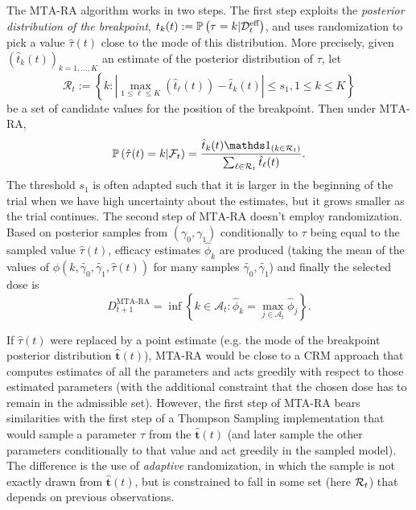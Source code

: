 The $\mathrm{MTA}$-$\mathrm{RA}$ algorithm works in two steps. The first step exploits the \emph{posterior distribution of the breakpoint}, $t_k(t) :=\mathbb{P}\left(\tau=k | \mathcal{D}_{t}^{\text{eff}}\right)$, and uses randomization to pick a value $\hat{\tau}(t)$ close to the mode of this distribution. More precisely, given $(\hat{t}_k(t))_{k=1,\dots,K}$ an estimate of the posterior distribution of $\tau$, let
\[
\mathcal{R}_t := \left\{
    k : \left| \max_{1 \le \ell \le K}(\hat{t}_\ell(t)) - \hat{t}_k(t) \right| \le s_1,
    1 \le k \le K
\right\}
\]
be a set of candidate values for the position of the breakpoint. Then under $\mathrm{MTA}$-$\mathrm{RA}$, 
\[\bP\left(\hat{\tau}(t) = k |\cF_t\right) = \frac{\hat{t}_k(t)\ind_{\left(k \in \cR_t\right)}}{\sum_{\ell \in \cR_t} \hat{t}_\ell(t)}. \]
The threshold $s_1$ is often adapted such that it is larger in the beginning of the trial when we have high uncertainty about the estimates, but it grows smaller as the trial continues. The second step of $\mathrm{MTA}$-$\mathrm{RA}$ doesn't employ randomization. Based on posterior samples from $(\gamma_0,\gamma_1)$ conditionally to $\tau$ being equal to the sampled value $\hat{\tau}(t)$, efficacy estimates $\hat{\phi}_k$ are produced (taking the mean of the values of $\phi(k,\tilde{\gamma_0},\tilde{\gamma_1},\hat{\tau}(t))$ for many samples $\tilde{\gamma_0},\tilde{\gamma_1}$) and finally the selected dose is 
\[ D_{t+1}^{\text{MTA-RA}} = \inf \left\{ k \in \mathcal{A}_t : \hat{\phi}_k = \max_{j \in \mathcal{A}_t} \hat{\phi}_j\right\}.\]

If $\hat{\tau}(t)$ were replaced by a point estimate (e.g. the mode of the breakpoint posterior distribution $\bm{\hat t}(t)$), MTA-RA would be close to a CRM approach that computes estimates of all the parameters and acts greedily with respect to those estimated parameters (with the additional constraint that the chosen dose has to remain in the admissible set). However, the first step of MTA-RA bears similarities with the first step of a Thompson Sampling implementation that would sample a parameter $\tau$ from the $\bm{\hat t}(t)$ (and later sample the other parameters conditionally to that value and act greedily in the sampled model). The difference is the use of \emph{adaptive} randomization, in which the sample is not exactly drawn from $\bm{\hat t}(t)$, but is constrained to fall in some set (here $\mathcal{R}_t$) that depends on previous observations. 

